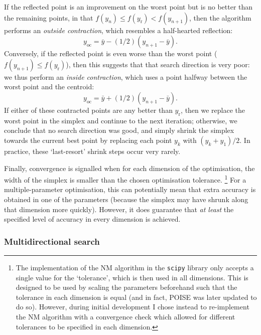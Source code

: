 If the reflected point is an improvement on the worst point but is no better than the remaining points, in that $f(y_n) \leq f(y_\text{r}) < f(y_{n+1})$, then the algorithm performs an \textit{outside contraction}, which resembles a half-hearted reflection:
\begin{equation}
    \label{eq:nm_outside_contract}
    y_\text{oc} = \bar{y} - (1/2)(y_{n+1} - \bar{y}).
\end{equation}
Conversely, if the reflected point is even worse than the worst point ($f(y_{n+1}) \leq f(y_\text{r})$), then this suggests that that search direction is very poor: we thus perform an \textit{inside contraction}, which uses a point halfway between the worst point and the centroid:
\begin{equation}
    \label{eq:nm_inside_contract}
    y_\text{oc} = \bar{y} + (1/2)(y_{n+1} - \bar{y}).
\end{equation}
If either of these contracted points are any better than $y_\text{r}$, then we replace the worst point in the simplex and continue to the next iteration; otherwise, we conclude that no search direction was good, and simply shrink the simplex towards the current best point by replacing each point $y_k$ with $(y_k + y_1)/2$.
In practice, these `last-resort' shrink steps occur very rarely.

Finally, convergence is signalled when for each dimension of the optimisation, the width of the simplex is smaller than the chosen optimisation tolerance.%
\footnote{The implementation of the NM algorithm in the \texttt{scipy} library only accepts a single value for the `tolerance', which is then used in all dimensions.
This is designed to be used by scaling the parameters beforehand such that the tolerance in each dimension is equal (and in fact, POISE was later updated to do so).
However, during initial development I chose instead to re-implement the NM algorithm with a convergence check which allowed for different tolerances to be specified in each dimension.}
For a multiple-parameter optimisation, this can potentially mean that extra accuracy is obtained in one of the parameters (because the simplex may have shrunk along that dimension more quickly).
However, it does guarantee that \textit{at least} the specified level of accuracy in every dimension is achieved.


\subsubsection{Multidirectional search}

